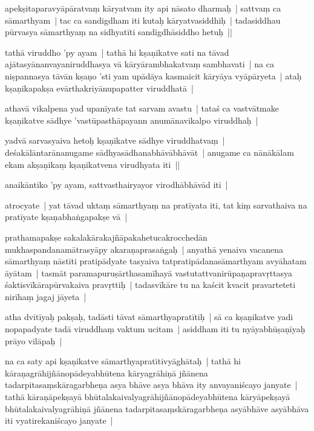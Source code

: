 \documentclass[article,a4paper]{memoir}
\begin{document}
	  \pstart apekṣitaparavyā\-pā\-ratvaṃ kā\-ryatvam ity api nā\-sato dharmaḥ | sattvaṃ ca sā\-marthyam | tac ca sandigdham iti kutaḥ kā\-ryatvasiddhiḥ | tadasiddhau pū\-rvasya sā\-marthyaṃ na sidhyatī\-ti sandigdhā\-siddho hetuḥ || 
	\pend
      

	  \pstart tathā\- viruddho 'py ayam | tathā\- hi kṣaṇikatve sati na tā\-vad ajā\-tasyā\-nanvayaniruddhasya vā\- kā\-ryā\-rambhakatvaṃ sambhavati | na ca niṣpannasya tā\-vā\-n kṣaṇo 'sti yam upā\-dā\-ya kasmaicit kā\-ryā\-ya vyā\-pā\-ryeta | ataḥ kṣaṇikapakṣa evā\-rthakriyā\-nupapatter viruddhatā\- | 
	\pend
      

	  \pstart athavā\- vikalpena yad upanī\-yate tat sarvam avastu | tataś ca vastvā\-tmake kṣaṇikatve sā\-dhye 'vastū\-pasthā\-payann anumā\-navikalpo viruddhaḥ | 
	\pend
      

	  \pstart yadvā\- sarvasyaiva hetoḥ kṣaṇikatve sā\-dhye viruddhatvaṃ | deśakā\-lā\-ntarā\-nanugame sā\-dhyasā\-dhanabhā\-vā\-bhā\-vā\-t | anugame ca nā\-nā\-kā\-lam ekam akṣaṇikaṃ kṣaṇikatvena virudhyata iti ||
	\pend
      

	  \pstart anaikā\-ntiko 'py ayam, sattvasthairyayor virodhā\-bhā\-vā\-d iti |
	\pend
      

	  \pstart atrocyate | yat tā\-vad uktaṃ sā\-marthyaṃ na pratī\-yata iti, tat kiṃ sarvathaiva na pratī\-yate kṣaṇabhaṅgapakṣe vā\- |
	\pend
      

	  \pstart prathamapakṣe sakalakā\-rakajñā\-pakahetucakrocchedā\-n mukhaspandanamā\-trasyā\-py akaraṇaprasaṅgaḥ | anyathā\- yenaiva vacanena sā\-marthyaṃ nā\-stī\-ti pratipā\-dyate tasyaiva tatpratipā\-danasā\-marthyam avyā\-hatam ā\-yā\-tam | tasmā\-t paramapuruṣā\-rthasamī\-hayā\- vastutattvanirū\-paṇapravṛttasya śaktisvī\-kā\-rapū\-rvakaiva pravṛttiḥ | tadasvī\-kā\-re tu na kaścit kvacit pravarteteti nirī\-haṃ jagaj jā\-yeta |
	\pend
      

	  \pstart atha dvitī\-yaḥ pakṣaḥ, tadā\-sti tā\-vat sā\-marthyapratī\-tiḥ | sā\- ca kṣaṇikatve yadi nopapadyate tadā\- viruddhaṃ vaktum ucitam | asiddham iti tu nyā\-yabhū\-ṣaṇī\-yaḥ prā\-yo vilā\-paḥ | 
	\pend
      

	  \pstart na ca saty api kṣaṇikatve sā\-marthyapratī\-tivyā\-ghā\-taḥ | tathā\- hi kā\-raṇagrā\-hijñā\-nopā\-deyabhū\-tena kā\-ryagrā\-hiṇā\- jñā\-nena tadarpitasaṃskā\-ragarbheṇa asya bhā\-ve asya bhā\-va ity anvayaniścayo janyate | tathā\- kā\-raṇā\-pekṣayā\- bhū\-talakaivalyagrā\-hijñā\-nopā\-deyabhū\-tena kā\-ryā\-pekṣayā\- bhū\-talakaivalyagrā\-hiṇā\- jñā\-nena tadarpitasaṃskā\-ragarbheṇa asyā\-bhā\-ve asyā\-bhā\-va iti vyatirekaniścayo janyate | 
	\pend
      
\end{document}
